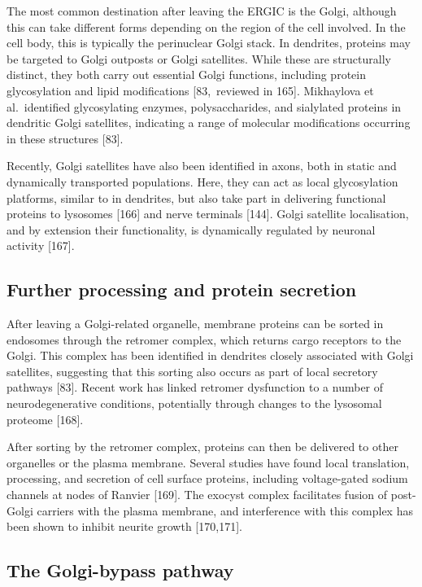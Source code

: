 \documentclass[
  12pt,
  a4paper,
]{book}
\begin{document}
The most common destination after leaving the ERGIC is the Golgi, although this can take different forms depending on the region of the cell involved. In the cell body, this is typically the perinuclear Golgi stack. In dendrites, proteins may be targeted to Golgi outposts or Golgi satellites. While these are structurally distinct, they both carry out essential Golgi functions, including protein glycosylation and lipid modifications {[}83,~reviewed in 165{]}. Mikhaylova et al.~identified glycosylating enzymes, polysaccharides, and sialylated proteins in dendritic Golgi satellites, indicating a range of molecular modifications occurring in these structures {[}83{]}.

Recently, Golgi satellites have also been identified in axons, both in static and dynamically transported populations. Here, they can act as local glycosylation platforms, similar to in dendrites, but also take part in delivering functional proteins to lysosomes {[}166{]} and nerve terminals {[}144{]}. Golgi satellite localisation, and by extension their functionality, is dynamically regulated by neuronal activity {[}167{]}.

\subsection{Further processing and protein secretion}\label{further-processing-and-protein-secretion}

After leaving a Golgi-related organelle, membrane proteins can be sorted in endosomes through the retromer complex, which returns cargo receptors to the Golgi. This complex has been identified in dendrites closely associated with Golgi satellites, suggesting that this sorting also occurs as part of local secretory pathways {[}83{]}. Recent work has linked retromer dysfunction to a number of neurodegenerative conditions, potentially through changes to the lysosomal proteome {[}168{]}.

After sorting by the retromer complex, proteins can then be delivered to other organelles or the plasma membrane. Several studies have found local translation, processing, and secretion of cell surface proteins, including voltage-gated sodium channels at nodes of Ranvier {[}169{]}. The exocyst complex facilitates fusion of post-Golgi carriers with the plasma membrane, and interference with this complex has been shown to inhibit neurite growth {[}170,171{]}.

\subsection{The Golgi-bypass pathway}\label{Golgi-bypass}
\end{document}
